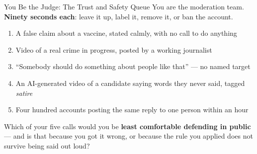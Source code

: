 ﻿\documentclass[aspectratio=169,11pt]{beamer}
\begin{document}
\begin{frame}[shrink=8]{You Be the Judge: The Trust and Safety Queue}
You are the moderation team. \textbf{Ninety seconds each}: leave it up, label it, remove it, or ban the account.

\begin{enumerate}
    \item A false claim about a vaccine, stated calmly, with no call to do anything
    \item Video of a real crime in progress, posted by a working journalist
    \item ``Somebody should do something about people like that'' --- no named target
    \item An AI-generated video of a candidate saying words they never said, tagged \emph{satire}
    \item Four hundred accounts posting the same reply to one person within an hour
\end{enumerate}

\begin{discussionbox}
Which of your five calls would you be \textbf{least comfortable defending in public} --- and is that because you got it wrong, or because the rule you applied does not survive being said out loud?
\end{discussionbox}
\end{frame}
\end{document}

